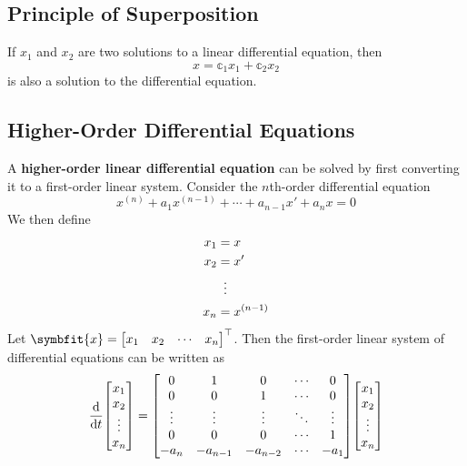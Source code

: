 \documentclass{article}
\begin{document}
	\subsection{Principle of Superposition}
	\begin{theorem}
		If $x_1$ and $x_2$ are two solutions to a linear differential equation, then
		\begin{equation*}
			x = \mathbb{c}_1 x_1 + \mathbb{c}_2 x_2
		\end{equation*}
		is also a solution to the differential equation.
	\end{theorem}
	\subsection{Higher-Order Differential Equations}
	\begin{theorem}
		A \textbf{higher-order linear differential equation} can be solved by first converting it to a first-order linear system. Consider the $n$th-order differential equation
		\begin{equation*}
			x^{\left( n \right)} + a_1 x^{\left( n-1 \right)} + \cdots + a_{n-1} x' + a_n x = 0
		\end{equation*}
		We then define
		\begin{align*}
			x_1 &= x \\
			x_2 &= x' \\
			&\vdotswithin{=} \\
			x_n &= x^{\left( n-1 \right)}
		\end{align*}
		Let $\symbfit{x}=\mqty[x_1 & x_2 & \cdots & x_n]^\top$. Then the first-order linear system of differential equations can be written as
		\begin{equation*}
			\dv{t}\mqty[
				x_1 \\
				x_2 \\
				\vdotswithin{x_3} \\
				x_n	
			] = \mqty[
				0 & 1 & 0 & \cdots & 0 \\
				0 & 0 & 1 & \cdots & 0 \\
				\vdots & \vdots & \vdots & \ddots & \vdots \\
				0 & 0 & 0 & \cdots & 1 \\
				-a_n & -a_{n-1} & -a_{n-2} & \cdots & -a_1
			] \mqty[
				x_1 \\
				x_2 \\
				\vdotswithin{x_3} \\
				x_n	
			]
		\end{equation*}
	\end{theorem}
\newpage

\listoffigures 

\newpage

\nocite{*}



\end{document}
